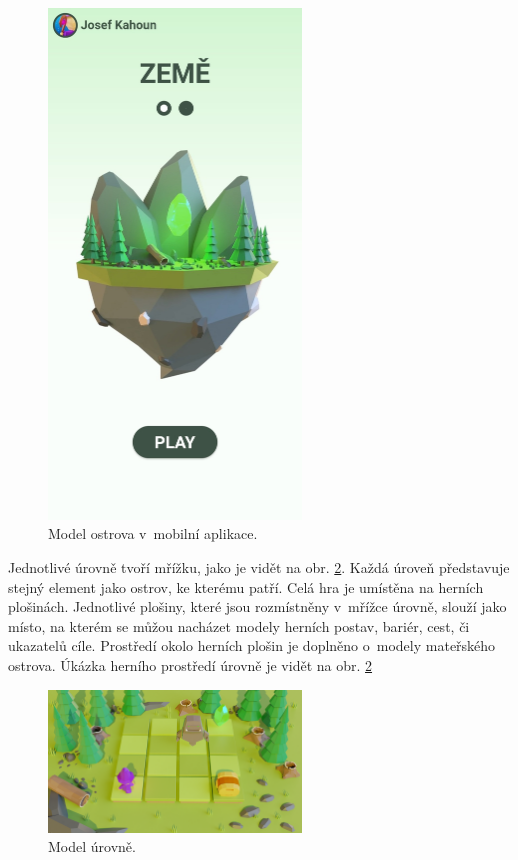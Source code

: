 \begin{figure}[h]
    \centering
    \includegraphics[width=0.6\textwidth]{img/mobilni-aplikace-ostrov.jpg}
    \caption{Model ostrova v~mobilní aplikace.}
    \label{fig:mobilni-aplikace-ostrov}
\end{figure}

Jednotlivé úrovně tvoří mřížku, jako je vidět na obr. \ref{fig:model-levelu}. Každá úroveň představuje stejný element jako ostrov, ke kterému patří. Celá hra je umístěna na herních plošinách. Jednotlivé plošiny, které jsou rozmístněny v~mřížce úrovně, slouží jako místo, na kterém se můžou nacházet modely herních postav, bariér, cest, či ukazatelů cíle. Prostředí okolo herních plošin je doplněno o~modely mateřského ostrova. Úkázka herního prostředí úrovně je vidět na obr. \ref{fig:model-levelu}

\begin{figure}[h]
    \centering
    \includegraphics[width=0.6\textwidth]{img/model-levelu.png}
    \caption{Model úrovně.}
    \label{fig:model-levelu}
\end{figure}